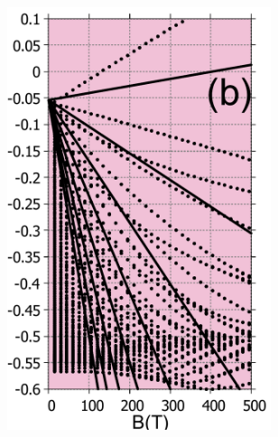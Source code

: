 \documentclass{report}
\begin{document}
\begin{figure}[htb]
	\centering
	\begin{subfigure}[b]{0.49\textwidth}
		\centering
		{\includegraphics[width=0.85\textwidth,height=1.2\linewidth]{pic/landaulevel_3band_q_797_EF_approx_solution.pdf}}
	\end{subfigure}
	\begin{subfigure}[b]{0.49\textwidth}
		\centering

\end{subfigure}
\end{figure}
\end{document}
